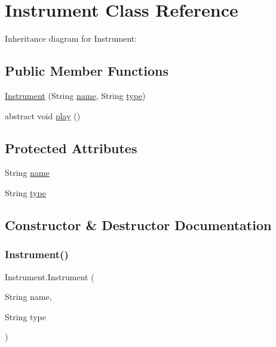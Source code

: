 \hypertarget{classInstrument}{}\section{Instrument Class Reference}
\label{classInstrument}


Inheritance diagram for Instrument\+:
\subsection*{Public Member Functions}
\begin{DoxyCompactItemize}
\item 
\hyperlink{classInstrument_a5db4b9cc0b6369c839125f7f2d6632b7}{Instrument} (String \hyperlink{classInstrument_a5781b39f34c3989aa540a17e26fbd0c8}{name}, String \hyperlink{classInstrument_a90bd9d446bbc526921ed35c654cb5a35}{type})
\item 
abstract void \hyperlink{classInstrument_a0ef204f0b4b5f213e395d363ffcfe153}{play} ()
\end{DoxyCompactItemize}
\subsection*{Protected Attributes}
\begin{DoxyCompactItemize}
\item 
String \hyperlink{classInstrument_a5781b39f34c3989aa540a17e26fbd0c8}{name}
\item 
String \hyperlink{classInstrument_a90bd9d446bbc526921ed35c654cb5a35}{type}
\end{DoxyCompactItemize}


\subsection{Constructor \& Destructor Documentation}
\mbox{\label{classInstrument_a5db4b9cc0b6369c839125f7f2d6632b7}} 
\subsubsection{\texorpdfstring{Instrument()}{Instrument()}}
{\footnotesize\ttfamily Instrument.\+Instrument (\begin{DoxyParamCaption}\item[{String}]{name,  }\item[{String}]{type }\end{DoxyParamCaption})\hspace{0.3cm}{\ttfamily [inline]}}



